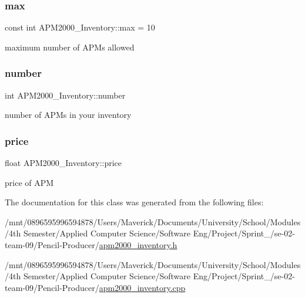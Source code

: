 \subsubsection{\texorpdfstring{max}{max}}
{\footnotesize\ttfamily const int A\+P\+M2000\+\_\+\+Inventory\+::max = 10\hspace{0.3cm}{\ttfamily [private]}}



maximum number of A\+P\+Ms allowed 

\mbox{\label{classAPM2000__Inventory_a0393939ee2dd57ec3855bb98070da2ad}} 
\subsubsection{\texorpdfstring{number}{number}}
{\footnotesize\ttfamily int A\+P\+M2000\+\_\+\+Inventory\+::number\hspace{0.3cm}{\ttfamily [private]}}



number of A\+P\+Ms in your inventory 

\mbox{\label{classAPM2000__Inventory_a56588e2f627cbe3fccf6235773d77889}} 
\subsubsection{\texorpdfstring{price}{price}}
{\footnotesize\ttfamily float A\+P\+M2000\+\_\+\+Inventory\+::price\hspace{0.3cm}{\ttfamily [private]}}



price of A\+PM 



The documentation for this class was generated from the following files\+:\begin{DoxyCompactItemize}
\item 
/mnt/0896595996594878/\+Users/\+Maverick/\+Documents/\+University/\+School/\+Modules/4th Semester/\+Applied Computer Science/\+Software Eng/\+Project/\+Sprint\+\_/se-\/02-\/team-\/09/\+Pencil-\/\+Producer/\hyperlink{apm2000__inventory_8h}{apm2000\+\_\+inventory.\+h}\item 
/mnt/0896595996594878/\+Users/\+Maverick/\+Documents/\+University/\+School/\+Modules/4th Semester/\+Applied Computer Science/\+Software Eng/\+Project/\+Sprint\+\_/se-\/02-\/team-\/09/\+Pencil-\/\+Producer/\hyperlink{apm2000__inventory_8cpp}{apm2000\+\_\+inventory.\+cpp}\end{DoxyCompactItemize}
